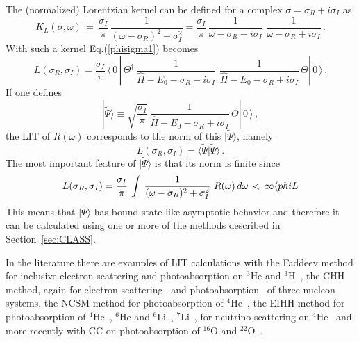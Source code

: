 The (normalized) Lorentzian kernel can be defined for a complex $\sigma=\sigma_R+i\sigma_I$ as 
\begin{equation}
 K_L(\sigma,\omega)\,=\, \frac{\sigma_I}{\pi}\,\frac{1}{(\omega-\sigma_R)^2+\sigma_I^2}=
 \frac{\sigma_I}{\pi}\,\frac{1}{\omega-\sigma_R-i\sigma_I}\,\,\frac{1}{\omega-\sigma_R+i\sigma_I}\,.
\end{equation}
With such a kernel Eq.(\ref{phisigma1}) becomes
\begin{equation}\label{Lsr}
L(\sigma_R,\sigma_I)= \frac{\sigma_I}{\pi}\,\langle\,0\,|\,\Theta^\dagger \,
\frac{1}{\hat H -E_0 -\sigma_R-i\sigma_I}\,\,\frac{1}{\hat H -E_0 -\sigma_R+i\sigma_I}\,\Theta|\,0\,\rangle\,.
\end{equation}
If one defines
\begin{equation}\label{psitilde}
|\tilde\Psi\rangle\equiv\sqrt{\frac{\sigma_I}{\pi}}\,\frac{1}{\hat H -E_0-\sigma_R+i\sigma_I}\,\Theta|\,0\,\rangle\,,
\end{equation}
the LIT of $R(\omega)$ corresponds to the norm of this $|\tilde\Psi\rangle$, namely
\begin{equation}\label{norm}
L(\sigma_R,\sigma_I)=\langle\tilde\Psi |\tilde\Psi\rangle\,.
\end{equation}
The most important feature of $|\tilde\Psi\rangle$ is that its norm is finite since 
\begin{equation}
L(\sigma_R,\sigma_I)=\frac{\sigma_I}{\pi}\,\int\,\frac{1}{(\omega-\sigma_R)^2+\sigma_I^2}\,\,R(\omega) \,d\omega\,<\,\infty
\langle{phiL}
\end{equation}
This means that $|\tilde\Psi\rangle$ has bound-state like asymptotic behavior and therefore it can be calculated using one or more 
of the methods described in Section~\ref{sec:CLASS}. 

In the literature there are examples of LIT calculations  with 
 the Faddeev method for inclusive electron scattering\cite{Sara95} and photoabsorption on $^3$He and $^3$H~\cite{Golak_Benchmark2002}, 
 the CHH method, again for electron scattering~\cite{long3H_2004} and photoabsorption~\cite{accuracy_2006}
 of three-nucleon systems,
 the NCSM method for  photoabsorption of $^4$He~\cite{Stetcu_2005}, 
 the EIHH method for  photoabsorption of $^4$He~\cite{Gazit_2006}, $^6$He and $^6$Li~\cite{He6_2004}, $^7$Li~\cite{Li7_2004}, 
for neutrino scattering  on $^4$He~\cite{neutrino_2007} and more recently with CC on photoabsorption of $^{16}$O and 
 $^{22}$O~\cite{CC_O16}. 

